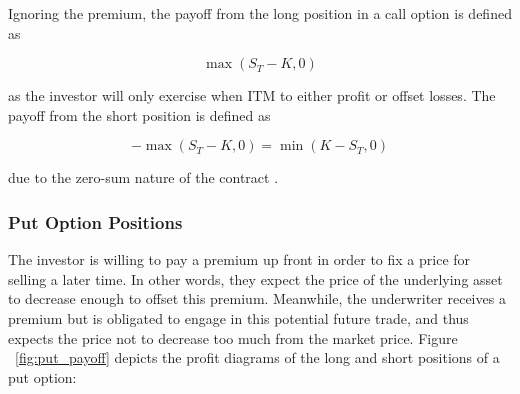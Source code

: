 \documentclass[english,12pt,a4paper,pdftex,sci,utf8]{aaltothesis}
\begin{document}
Ignoring the premium, the payoff from the long position in a call option is defined as

\begin{equation}
    \max(S_T-K,0)
\end{equation}

as the investor will only exercise when ITM to either profit or offset losses. The payoff from the short position is defined as


\begin{equation}
    -\max(S_T-K,0) = \min(K-S_T,0)
\end{equation}

due to the zero-sum nature of the contract \cite[p. 9]{hull2016options}.


\subsubsection{Put Option Positions}
The investor is willing to pay a premium up front in order to fix a price for selling a later time. In other words, they expect the price of the underlying asset to decrease enough to offset this premium. Meanwhile, the underwriter receives a premium but is obligated to engage in this potential future trade, and thus expects the price not to decrease too much from the market price. Figure ~\ref{fig:put_payoff} depicts the profit diagrams of the long and short positions of a put option:
\end{document}
